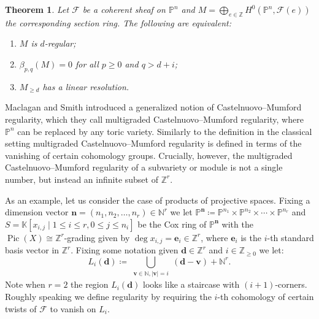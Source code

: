 \documentclass[11pt,reqno]{amsart}
\newtheorem{theorem}[lemma]{Theorem}
\newtheorem{defn}[lemma]{Definition}
\theoremstyle{remark}
\newcommand{\reg}{\operatorname{reg}}
\newcommand{\Pic}{\operatorname{Pic}}
\newcommand{\dd}{\mathbf d}
\newcommand{\ee}{\mathbf e}
\newcommand{\vv}{\mathbf v}
\newcommand{\nn}{\mathbf n}
\newcommand{\cF}{\mathcal{F}}
\newcommand{\C}{\mathbb{C}}
\newcommand{\K}{\mathbb{K}}
\newcommand{\N}{\mathbb{N}}
\renewcommand{\P}{\mathbb{P}}
\newcommand{\Z}{\mathbb{Z}}
\begin{document}

%


\begin{theorem}\cite{eisenbudGoto84}\label{thm:eisenbud-goto}
Let $\cF$ be a coherent sheaf on $\P^{n}$ and $M=\bigoplus_{e\in\Z} H^0(\P^{n},\cF(e))$ the corresponding section ring. The following are equivalent:
\begin{enumerate}
\item $M$ is $d$-regular;
\item $\beta_{p,q}(M)=0$ for all $p\geq0$ and $q>d+i$;
\item $M_{\geq d}$ has a linear resolution. 
\end{enumerate}
\end{theorem}

Maclagan and Smith introduced a generalized notion of Castelnuovo--Mumford regularity, which they call multigraded Castelnuovo--Mumford regularity, where $\P^{n}$ can be replaced by any toric variety. Similarly to the definition in the classical setting multigraded Castelnuovo--Mumford regularity is defined in terms of the vanishing of certain cohomology groups. Crucially, however, the multigraded Castelnuovo--Mumford regularity of a subvariety or module is not a single number, but instead an infinite subset of $\Z^{r}$. 

As an example, let us consider the case of  products of projective spaces. Fixing a dimension vector $\nn=(n_1,n_2,\ldots,n_{r})\in \N^{r}$ we let $\P^{\nn}\coloneqq \P^{n_1}\times \P^{n_2}\times \cdots \times \P^{n_r}$ and $S=\K[x_{i,j} \; |\; 1\leq i \leq r, 0\leq j \leq n_{i}]$ be the Cox ring of $\P^{\nn}$ with the $\Pic(X)\cong \Z^{r}$-grading given by $\deg x_{i,j} = \ee_{i} \in \Z^{r}$, where $\ee_{i}$ is the $i$-th standard basis vector in $\Z^{r}$. Fixing some notation given $\dd\in \Z^{r}$ and $i\in \Z_{\geq0}$ we let:
\[
L_{i}(\dd)\coloneqq \bigcup_{\substack{\vv \in \N, |\vv| = i}} (\dd-\vv)+\N^{r}.
\]
Note when $r=2$ the region $L_{i}(\dd)$ looks like a staircase with $(i+1)$-corners. Roughly speaking we define regularity by requiring the $i$-th cohomology of certain twists of $\cF$ to vanish on $L_{i}$. 
\end{document}
